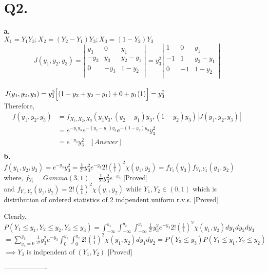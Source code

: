 \documentclass[a4paper,11pt]{article}
\begin{document}
\section*{Q2.}
\textbf{a.}\\
$X_1 = Y_1Y_3; X_2 = (Y_2 - Y_1)Y_3; X_3 = (1-Y_2)Y_3$
 \[
   J(y_1,y_2,y_3)=
  \left| {\begin{array}{ccc}
    y_3 & 0 & y_1\\
    -y_3& y_3 &y_2-y_1 \\
    0& -y_3 & 1-y_2\\
  \end{array} } \right| = y_3^2\left| {\begin{array}{ccc}
    1 & 0 & y_1\\
    -1& 1 &y_2-y_1 \\
    0& -1 & 1-y_2\\
  \end{array} } \right|
\]\\
$J(y_1,y_2,y_3)= y_3^2\Big{[} (1-y_2 + y_2-y_1) + 0 + y_1(1)\Big{]} = y_3^2 $\\
Therefore,
\begin{align*}
 f(y_1,y_2,y_3) &= f_{X_1,X_2,X_3}(y_1y_3,(y_2 - y_1)y_3,(1-y_2)y_3)|J(y_1,y_2,y_3)|\\
 &= e^{-y_1y_3}e^{-(y_2 - y_1)y_3}e^{-(1-y_2)y_3}y_3^2\\
 &= e^{-y_3}y_3^2 \hspace{10pt}[Answer]\\
\end{align*}
\textbf{b.}\\
$f(y_1,y_2,y_3) = e^{-y_3}y_3^2 = \frac{1}{2!}y_3^2e^{-y_3} 2!(\frac{1}{1})^2\chi(y_1,y_2) = f_{Y_3}(y_3)f_{Y_1,Y_2}(y_1,y_2)$ \\
where, $f_{Y_3} = Gamma(3,1) = \frac{1}{2!}y_3^2e^{-y_3}$ [Proved]\\
and $f_{Y_1,Y_2}(y_1,y_2) = 2!(\frac{1}{1})^2\chi(y_1,y_2)$ while $Y_1,Y_2 \in (0,1)$ which is  distribution of ordered statistics of 2 indpendent uniform r.v.s. [Proved]

Clearly, $P(Y_1 \leq y_1,Y_2 \leq y_2,Y_3 \leq y_3) = \int_{-\infty}^{y_1}\int_{-\infty}^{y_2}\int_{-\infty}^{y_3}\frac{1}{2!}y_3^2e^{-y_3} 2!(\frac{1}{1})^2\chi(y_1,y_2)dy_1dy_2dy_3$\\
$= \sum_{y_3=0}^{y_3}\frac{1}{2!}y_3^2e^{-y_3}\int_{0}^{y_1}\int_{0}^{y_2}2!(\frac{1}{1})^2\chi(y_1,y_2)dy_1dy_2 = P(Y_3 \leq y_3)P(Y_1 \leq y_1,Y_2 \leq y_2)$\\
$\implies Y_3$ is indpendent of $(Y_1,Y_2)$ [Proved]
\begin{center}
 -------------------
\end{center}
\end{document}
